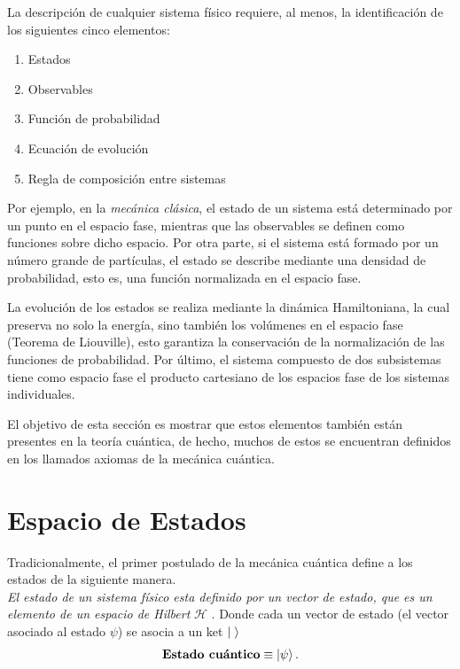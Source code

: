 \documentclass[../Main.tex]{subfiles}
\begin{document}
La descripción de cualquier sistema físico requiere, al menos, la identificación de los siguientes cinco elementos:
\begin{enumerate}
    \item Estados
    \item Observables
    \item Función de probabilidad
    \item Ecuación de evolución
    \item Regla de composición entre sistemas
\end{enumerate}

Por ejemplo, en la \emph{mecánica clásica}, el estado de un sistema está determinado por un punto en el espacio fase, mientras que las observables se definen como funciones sobre dicho espacio. Por otra parte, si el sistema está formado por un número grande de partículas, el estado se describe mediante una densidad de probabilidad, esto es, una función normalizada en el espacio fase.

La evolución de los estados se realiza mediante la dinámica Hamiltoniana, la cual preserva no solo la energía, sino también los volúmenes en el espacio fase (Teorema de Liouville), esto garantiza la conservación de la normalización de las funciones de probabilidad. Por último, el sistema compuesto de dos subsistemas tiene como espacio fase el producto cartesiano de los espacios fase de los sistemas individuales.


El objetivo de esta sección es mostrar que estos elementos también están presentes en la teoría cuántica, de hecho, muchos de estos se encuentran definidos en los llamados axiomas de la mecánica cuántica.





\section{Espacio de Estados}

Tradicionalmente, el primer postulado de la mecánica cuántica define a los estados de la siguiente manera.\\
\emph{El estado de un sistema físico esta definido por un vector de estado, que es un elemento de un espacio de Hilbert} $\mathcal{H}$ \cite{Cohen}.
Donde cada un vector de estado (el vector asociado al estado $\psi$) se asocia a un ket $\ket{\;}$
\begin{equation}
    \textbf{Estado cuántico} \equiv \ket{\psi}.
\end{equation}
\end{document}
